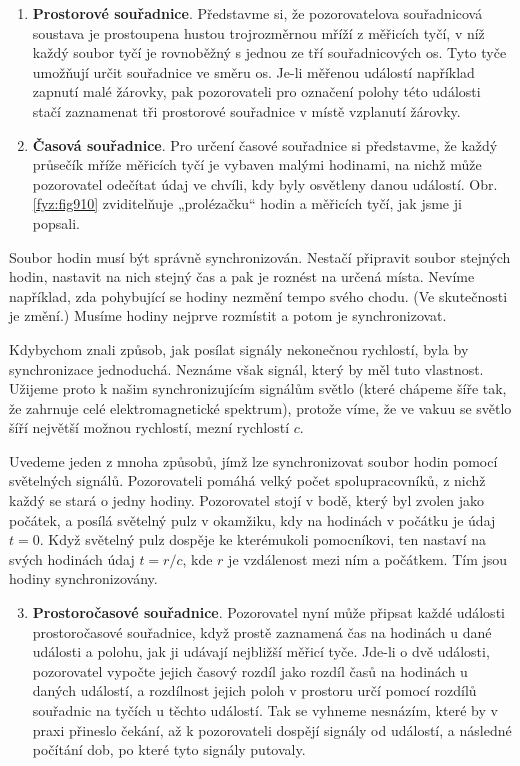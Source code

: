     \begin{enumerate}[noitemsep]
      \item \textbf{Prostorové souřadnice}. Představme si, že pozorovatelova souřadnicová soustava
            je prostoupena hustou trojrozměrnou mříží z měřicích tyčí, v níž každý soubor tyčí je
            rovnoběžný s jednou ze tří souřadnicových os. Tyto tyče umožňují určit souřadnice ve
            směru os. Je-li měřenou událostí například zapnutí malé žárovky, pak pozorovateli pro
            označení polohy této události stačí zaznamenat tři prostorové souřadnice v místě
            vzplanutí žárovky.
      \item \textbf{Časová souřadnice}. Pro určení časové souřadnice si představme, že každý
            průsečík mříže měřicích tyčí je vybaven malými hodinami, na nichž může pozorovatel
            odečítat údaj ve chvíli, kdy byly osvětleny danou událostí. Obr. \ref{fyz:fig910}
            zviditelňuje „prolézačku“ hodin a měřicích tyčí, jak jsme ji popsali.
    \end{enumerate}

    Soubor hodin musí být správně synchronizován. Nestačí připravit soubor stejných hodin, nastavit
    na nich stejný čas a pak je roznést na určená místa. Nevíme například, zda pohybující se hodiny
    nezmění tempo svého chodu. (Ve skutečnosti je změní.) Musíme hodiny nejprve rozmístit a potom je
    synchronizovat.

    Kdybychom znali způsob, jak posílat signály nekonečnou rychlostí, byla by synchronizace
    jednoduchá. Neznáme však signál, který by měl tuto vlastnost. Užijeme proto k našim
    synchronizujícím signálům světlo (které chápeme šíře tak, že zahrnuje celé elektromagnetické
    spektrum), protože víme, že ve vakuu se světlo šíří největší možnou rychlostí, mezní rychlostí
    \(c\).

    Uvedeme jeden z mnoha způsobů, jímž lze synchronizovat soubor hodin pomocí světelných signálů.
    Pozorovateli pomáhá velký počet spolupracovníků, z nichž každý se stará o jedny hodiny.
    Pozorovatel stojí v bodě, který byl zvolen jako počátek, a posílá světelný pulz v okamžiku, kdy
    na hodinách v počátku je údaj \(t = 0\). Když světelný pulz dospěje ke kterémukoli pomocníkovi,
    ten nastaví na svých hodinách údaj \(t = r/c\), kde \(r\) je vzdálenost mezi ním a počátkem. Tím
    jsou hodiny synchronizovány.

    \begin{enumerate}[noitemsep]
      \setcounter{enumi}{2}
      \item \textbf{Prostoročasové souřadnice}. Pozorovatel nyní může připsat každé události
            prostoročasové souřadnice, když prostě zaznamená čas na hodinách u dané události a
            polohu, jak ji udávají nejbližší měřicí tyče. Jde-li o dvě události, pozorovatel vypočte
            jejich časový rozdíl jako rozdíl časů na hodinách u daných událostí, a rozdílnost jejich
            poloh v prostoru určí pomocí rozdílů souřadnic na tyčích u těchto událostí. Tak se
            vyhneme nesnázím, které by v praxi přineslo čekání, až k pozorovateli dospějí signály
            od událostí, a následné počítání dob, po které tyto signály putovaly.
    \end{enumerate}
  
